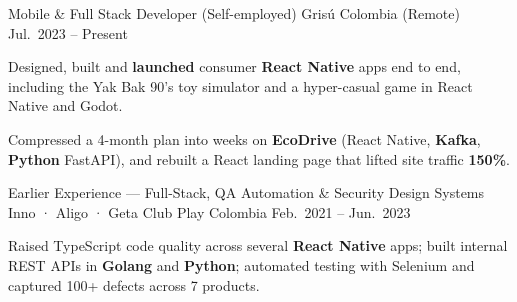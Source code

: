 \begin{cventries}
  \cventry
  {Mobile \& Full Stack Developer (Self-employed)}
  {Grisú}
  {Colombia (Remote)}
  {Jul.\ 2023 -- Present}
  {
    \begin{cvitems}
      \item {Designed, built and \textbf{launched} consumer \textbf{React Native} apps end to end, including the Yak Bak 90's toy simulator and a hyper-casual game in React Native and Godot.}
      \item {Compressed a 4-month plan into weeks on \textbf{EcoDrive} (React Native, \textbf{Kafka}, \textbf{Python} FastAPI), and rebuilt a React landing page that lifted site traffic \textbf{150\%}.}
    \end{cvitems}
  }

  \cventry
  {Earlier Experience --- Full-Stack, QA Automation \& Security}
  {Design Systems Inno · Aligo · Geta Club Play}
  {Colombia}
  {Feb.\ 2021 -- Jun.\ 2023}
  {
    \begin{cvitems}
      \item {Raised TypeScript code quality across several \textbf{React Native} apps; built internal REST APIs in \textbf{Golang} and \textbf{Python}; automated testing with Selenium and captured 100+ defects across 7 products.}
    \end{cvitems}
  }

\end{cventries}
